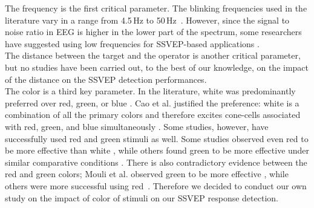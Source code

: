 \documentclass[smallextended]{svjour3}
\begin{document}
The frequency is the first critical parameter. The blinking frequencies used in the literature vary in a range from 4.5\,Hz to 50\,Hz~\cite{Zhu2010}. However, since the signal to noise ratio in EEG is higher in the lower part of the spectrum, some researchers have suggested using low frequencies for SSVEP-based applications \cite{paper6}.\\
The distance between the target and the operator is another critical parameter, but no studies have been carried out, to the best of our knowledge, on the impact of the distance on the SSVEP detection performances.\\
The color is a third key parameter. In the literature, white was predominantly preferred over red, green, or blue \cite{paper6,aljshamee2014beyond,aljshamee2016discriminate,cao2012flashing,paper2}. Cao et al. justified the preference: white is a combination of all the primary colors and therefore excites cone-cells associated with red, green, and blue simultaneously \cite{cao2012flashing}. 
Some studies, however, have successfully used red \cite{Faller2010,jian2014improving,paper4} and green \cite{chua2004effects,duvinage2013performance,SSVEPfiability,hvaring2014comparison,paper4,mouli2013performance} stimuli as well. Some studies observed even red to be more effective than white \cite{Faller2010,hvaring2014comparison}, while others found green to be more effective under similar comparative conditions \cite{chua2004effects,duvinage2013performance}. 
There is also contradictory evidence between the red and green colors; Mouli et al. observed green to be more effective \cite{mouli2013performance}, while others were more successful using red~\cite{cao2012flashing}. Therefore we decided to conduct our own study on the impact of color of stimuli on our SSVEP response detection.


\end{document}
